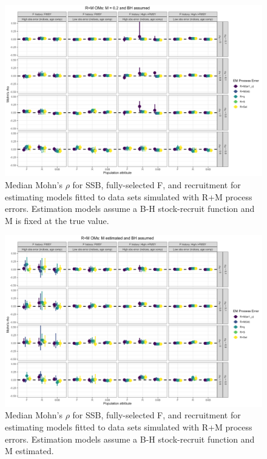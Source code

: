 \documentclass[
  12pt,
]{article}
\begin{document}
\begin{landscape}
\begin{figure}
\caption{Median Mohn's $\rho$ for SSB, fully-selected F, and recruitment for estimating models fitted to data sets simulated with R+M process errors.  Estimation models assume a B-H stock-recruit function and M is fixed at the true value.}\label{M_om_em_BH_MF_mohns_rho}
\begin{center}
\includegraphics[width = \textwidth]{M_om_mohns_rho_BH_MF.png}
\end{center}
\end{figure}
\end{landscape}

\begin{landscape}
\begin{figure}
\caption{Median Mohn's $\rho$ for SSB, fully-selected F, and recruitment for estimating models fitted to data sets simulated with R+M process errors.  Estimation models assume a B-H stock-recruit function and M estimated.}\label{M_om_em_BH_ME_mohns_rho}
\begin{center}
\includegraphics[width = \textwidth]{M_om_mohns_rho_BH_ME.png}
\end{center}
\end{figure}
\end{landscape}
\end{document}
